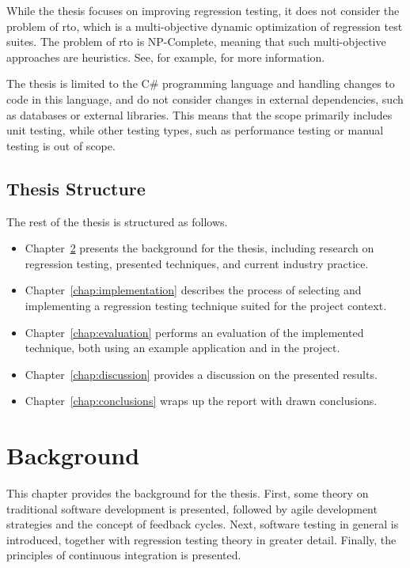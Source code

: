 \documentclass[a4paper,english,12pt]{report}
\let\Chapter\chapter
\def\chapter{\addtocontents{lol}{\protect\addvspace{10pt}}\Chapter}
\begin{document}
While the thesis focuses on improving regression testing, it does not consider the problem of \gls{rto}, which is a multi-objective dynamic optimization of regression test suites. The problem of \gls{rto} is NP-Complete, meaning that such multi-objective approaches are heuristics. See, for example, \citet{anwar2014exploration} for more information.

The thesis is limited to the C\# programming language and handling changes to code in this language, and do not consider changes in external dependencies, such as databases or external libraries. This means that the scope primarily includes unit testing, while other testing types, such as performance testing or manual testing is out of scope.

\section{Thesis Structure}
The rest of the thesis is structured as follows.

\begin{itemize}
  \item Chapter~\ref{chap:background} presents the background for the thesis, including research on regression testing, presented techniques, and current industry practice.
  \item Chapter~\ref{chap:implementation} describes the process of selecting and implementing a regression testing technique suited for the project context.
  \item Chapter~\ref{chap:evaluation} performs an evaluation of the implemented technique, both using an example application and in the project. 
  \item Chapter~\ref{chap:discussion} provides a discussion on the presented results.
  \item Chapter~\ref{chap:conclusions} wraps up the report with drawn conclusions.
\end{itemize}

\chapter{Background}\label{chap:background}
This chapter provides the background for the thesis. First, some theory on traditional software development is presented, followed by agile development strategies and the concept of feedback cycles. Next, software testing in general is introduced, together with regression testing theory in greater detail. Finally, the principles of continuous integration is presented.
\end{document}
